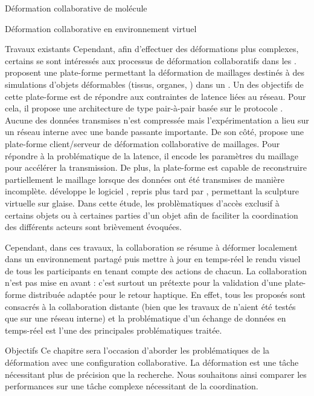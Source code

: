 \documentclass[myfrancais]{mythesis}
\begin{document}
\begin{mychapter}{Déformation collaborative de molécule}
\begin{mysection}{Déformation collaborative en environnement virtuel}
\begin{mysubsection}{Travaux existants}
				Cependant, afin d'effectuer des déformations plus complexes, certains se sont intéressés aux processus de déformation collaboratifs dans les .
				 proposent une plate-forme permettant la déformation de maillages destinés à des simulations d'objets déformables (tissus, organes, \myetc) dans un .
				Un des objectifs de cette plate-forme est de répondre aux contraintes de latence liées au réseau.
				Pour cela, il propose une architecture de type pair-à-pair basée sur le protocole .
				Aucune des données transmises n'est compressée mais l'expérimentation a lieu sur un réseau interne avec une bande passante importante.
				De son côté,  propose une plate-forme client/serveur de déformation collaborative de maillages.
				Pour répondre à la problématique de la latence, il encode les paramètres du maillage pour accélérer la transmission.
				De plus, la plate-forme est capable de reconstruire partiellement le maillage lorsque des données ont été transmises de manière incomplète.
				 développe le logiciel \myClayWorks, repris plus tard par , permettant la sculpture virtuelle sur glaise.
				Dans cette étude, les problèmatiques d'accès exclusif à certains objets ou à certaines parties d'un objet afin de faciliter la coordination des différents acteurs sont brièvement évoquées.

				Cependant, dans ces travaux, la collaboration se résume à déformer localement dans un environnement partagé puis mettre à jour en temps-réel le rendu visuel de tous les participants en tenant compte des actions de chacun.
				La collaboration n'est pas mise en avant : c'est surtout un prétexte pour la validation d'une plate-forme distribuée adaptée pour le retour haptique.
				En effet, tous les  proposés sont consacrés à la collaboration distante (bien que les travaux de  n'aient été testés que sur une réseau interne) et la problématique d'un échange de données en temps-réel est l'une des principales problématiques traitée.
			\end{mysubsection}
			\begin{mysubsection}{Objectifs}
				Ce chapitre sera l'occasion d'aborder les problématiques de la déformation avec une configuration collaborative.
				La déformation est une tâche nécessitant plus de précision que la recherche.
				Nous souhaitons ainsi comparer les performances sur une tâche complexe nécessitant de la coordination.


\end{mysubsection}
\end{mysection}
\end{mychapter}
\end{document}
